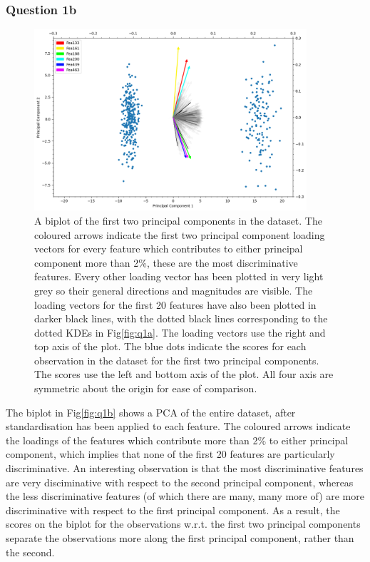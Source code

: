 \subsubsection{Question 1b}\label{subsubsec:q1b}

    \begin{figure}[htb]
    \centering
    \includegraphics[width=0.9\textwidth]{./figures/q1b}
    \caption{A biplot of the first two principal components in the  dataset.
        The coloured arrows indicate the first two principal component loading vectors for every feature which contributes to
        either principal component more than 2\%, these are the most discriminative features.
        Every other loading vector has been plotted in very light grey so their general directions and magnitudes are
        visible.
        The loading vectors for the first 20 features have also been plotted in darker black lines, with the dotted
        black lines corresponding to the dotted KDEs in Fig\eqref{fig:q1a}.
        The loading vectors use the right and top axis of the plot.
        The blue dots indicate the scores for each observation in the dataset for the first two principal components.
        The scores use the left and bottom axis of the plot.
        All four axis are symmetric about the origin for ease of comparison.}
    \label{fig:q1b}
    \end{figure}

    The biplot in Fig\eqref{fig:q1b} shows a PCA of the entire dataset, after standardisation has been applied to each
    feature.
    The coloured arrows indicate the loadings of the features which contribute more than 2\% to either principal
    component, which implies that none of the first 20 features are particularly discriminative.
    An interesting observation is that the most discriminative features are very disciminative with respect to the
    second principal component, whereas the less discriminative features (of which there are many, many more of) are
    more discriminative with respect to the first principal component.
    As a result, the scores on the biplot for the observations w.r.t. the first two principal components separate the
    observations more along the first principal component, rather than the second.

